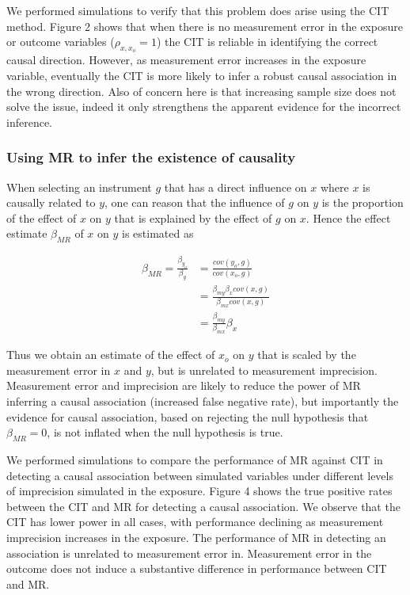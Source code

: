 \documentclass[]{article}
\begin{document}
We performed simulations to verify that this problem does arise using
the CIT method. Figure 2 shows that when there is no measurement error
in the exposure or outcome variables (\(\rho_{x, x_o}=1\)) the CIT is
reliable in identifying the correct causal direction. However, as
measurement error increases in the exposure variable, eventually the CIT
is more likely to infer a robust causal association in the wrong
direction. Also of concern here is that increasing sample size does not
solve the issue, indeed it only strengthens the apparent evidence for
the incorrect inference.

\subsubsection{Using MR to infer the existence of
causality}\label{using-mr-to-infer-the-existence-of-causality}

When selecting an instrument \(g\) that has a direct influence on \(x\)
where \(x\) is causally related to \(y\), one can reason that the
influence of \(g\) on \(y\) is the proportion of the effect of \(x\) on
\(y\) that is explained by the effect of \(g\) on \(x\). Hence the
effect estimate \(\beta_{MR}\) of \(x\) on \(y\) is estimated as

\[
\begin{aligned}
\beta_{MR} = \frac{\beta_{y_o}}{\beta_g} & = \frac{cov(y_o, g)}{cov(x_o, g)} \\
                                         & = \frac{\beta_{my} \beta_x cov(x, g)} {\beta_{mx} cov(x, g)} \\
                                         & = \frac{\beta_{my}} {\beta_{mx}} \beta_x
\end{aligned}
\]

Thus we obtain an estimate of the effect of \(x_o\) on \(y\) that is
scaled by the measurement error in \(x\) and \(y\), but is unrelated to
measurement imprecision. Measurement error and imprecision are likely to
reduce the power of MR inferring a causal association (increased false
negative rate), but importantly the evidence for causal association,
based on rejecting the null hypothesis that \(\beta_{MR} = 0\), is not
inflated when the null hypothesis is true.

We performed simulations to compare the performance of MR against CIT in
detecting a causal association between simulated variables under
different levels of imprecision simulated in the exposure. Figure 4
shows the true positive rates between the CIT and MR for detecting a
causal association. We observe that the CIT has lower power in all
cases, with performance declining as measurement imprecision increases
in the exposure. The performance of MR in detecting an association is
unrelated to measurement error in. Measurement error in the outcome does
not induce a substantive difference in performance between CIT and MR.
\end{document}

